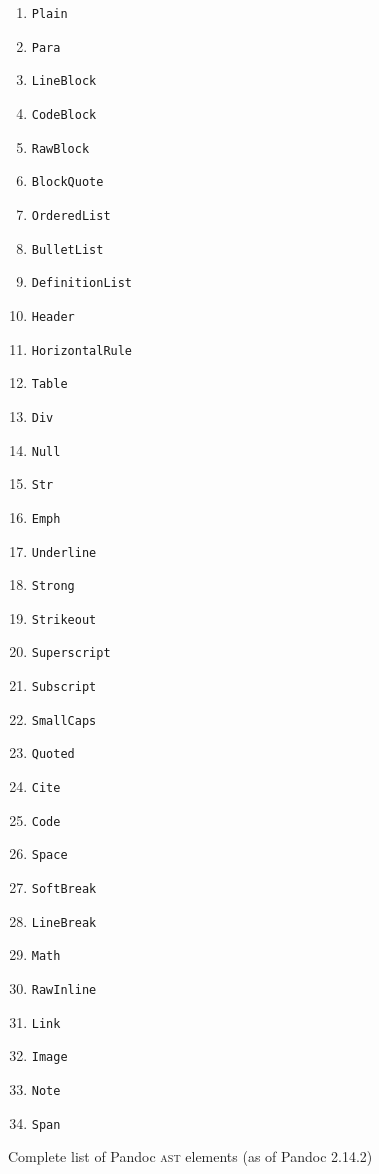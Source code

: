 \documentclass[
  digital,     %
  oneside,     %
  nosansbold,  %
  nocolorbold, %
  lof,         %
  lot,         %
]{fithesis4}
\begin{document}
\begin{figure}
  \centering
  \begin{multicols}{3}
    \begin{enumerate}
      \item \texttt{Plain}
      \item \texttt{Para}
      \item \texttt{LineBlock}
      \item \texttt{CodeBlock}
      \item \texttt{RawBlock}
      \item \texttt{BlockQuote}
      \item \texttt{OrderedList}
      \item \texttt{BulletList}
      \item \texttt{DefinitionList}
      \item \texttt{Header}
      \item \texttt{HorizontalRule}
      \item \texttt{Table}
      \item \texttt{Div}
      \item \texttt{Null}
      \item \texttt{Str}
      \item \texttt{Emph}
      \item \texttt{Underline}
      \item \texttt{Strong}
      \item \texttt{Strikeout}
      \item \texttt{Superscript}
      \item \texttt{Subscript}
      \item \texttt{SmallCaps}
      \item \texttt{Quoted}
      \item \texttt{Cite}
      \item \texttt{Code}
      \item \texttt{Space}
      \item \texttt{SoftBreak}
      \item \texttt{LineBreak}
      \item \texttt{Math}
      \item \texttt{RawInline}
      \item \texttt{Link}
      \item \texttt{Image}
      \item \texttt{Note}
      \item \texttt{Span}
    \end{enumerate}
  \end{multicols}
  \vspace*{-1em}
  \caption{Complete list of Pandoc \textsc{ast} elements (as of Pandoc 2.14.2)}
  \label{fig:pandoc-elems}
\end{figure}
\end{document}
